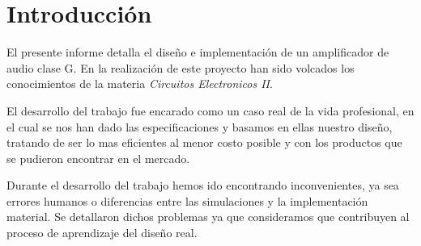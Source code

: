 \section{Introducción}
\bigskip
El presente informe detalla el diseño e implementación de un amplificador de audio clase G. En la realización de este proyecto han sido volcados los conocimientos de la materia \emph{Circuitos Electronicos II}.
	
El desarrollo del trabajo fue encarado como un caso real de la vida profesional, en el cual se nos han dado las especificaciones y basamos en ellas nuestro diseño, tratando de ser lo mas eficientes al menor costo posible y con los productos que se pudieron encontrar en el mercado.
	
Durante el desarrollo del trabajo hemos ido encontrando inconvenientes, ya sea errores humanos o diferencias entre las simulaciones y la implementación material. Se detallaron dichos problemas ya que consideramos que contribuyen al proceso de aprendizaje del diseño real.